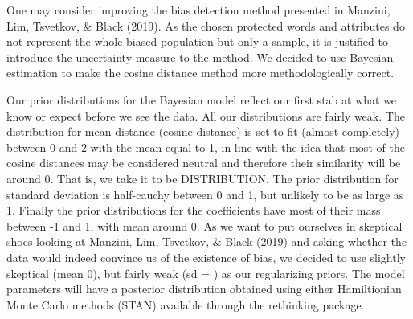 \documentclass[
  10pt,
  dvipsnames,enabledeprecatedfontcommands]{scrartcl}
\begin{document}
One may consider improving the bias detection method presented in
Manzini, Lim, Tsvetkov, \& Black (2019). As the chosen protected words
and attributes do not represent the whole biased population but only a
sample, it is justified to introduce the uncertainty measure to the
method. We decided to use Bayesian estimation to make the cosine
distance method more methodologically correct.

Our prior distributions for the Bayesian model reflect our first stab at
what we know or expect before we see the data. All our distributions are
fairly weak. The distribution for mean distance (cosine distance) is set
to fit (almost completely) between 0 and 2 with the mean equal to 1, in
line with the idea that most of the cosine distances may be considered
neutral and therefore their similarity will be around 0. That is, we
take it to be DISTRIBUTION. The prior distribution for standard
deviation is half-cauchy between 0 and 1, but unlikely to be as large as
1. Finally the prior distributions for the coefficients have most of
their mass between -1 and 1, with mean around 0. As we want to put
ourselves in skeptical shoes looking at Manzini, Lim, Tsvetkov, \& Black
(2019) and asking whether the data would indeed convince us of the
existence of bias, we decided to use slightly skeptical (mean 0), but
fairly weak (sd = ) as our regularizing priors. The model parameters
will have a posterior distribution obtained using either Hamiltionian
Monte Carlo methods (STAN) available through the rethinking package.
\end{document}
